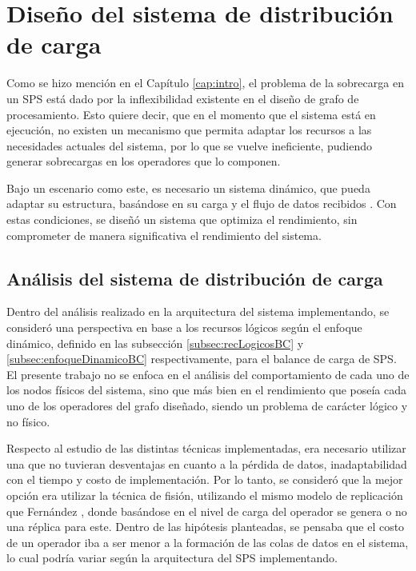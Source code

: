 \chapter{Dise\~no del sistema de distribución de carga}
\label{cap:disenoSistema}

Como se hizo mención en el Capítulo \ref{cap:intro}, el problema de la sobrecarga en un SPS está dado por la inflexibilidad existente en el diseño de grafo de procesamiento. Esto quiere decir, que en el momento que el sistema está en ejecución, no existen un mecanismo que permita adaptar los recursos a las necesidades actuales del sistema, por lo que se vuelve ineficiente, pudiendo generar sobrecargas en los operadores que lo componen.

Bajo un escenario como este, es necesario un sistema dinámico, que pueda adaptar su estructura, basándose en su carga y el flujo de datos recibidos . Con estas condiciones, se diseñó un sistema que optimiza el rendimiento, sin comprometer de manera significativa el rendimiento del sistema.

\section{Análisis del sistema de distribución de carga}
Dentro del análisis realizado en la arquitectura del sistema implementando, se consideró una perspectiva en base a los recursos lógicos según el enfoque dinámico, definido en las subsección \ref{subsec:recLogicosBC} y \ref{subsec:enfoqueDinamicoBC} respectivamente, para el balance de carga de SPS. El presente trabajo no se enfoca en el análisis del comportamiento de cada uno de los nodos físicos del sistema, sino que más bien en el rendimiento que poseía cada uno de los operadores del grafo diseñado, siendo un problema de carácter lógico y no físico.

Respecto al estudio de las distintas técnicas implementadas, era necesario utilizar una que no tuvieran desventajas en cuanto a la pérdida de datos, inadaptabilidad con el tiempo y costo de implementación. Por lo tanto, se consideró que la mejor opción era utilizar la técnica de fisión, utilizando el mismo modelo de replicación que Fernández \citep{FernandezMKP13}, donde basándose en el nivel de carga del operador se genera o no una réplica para este. Dentro de las hipótesis planteadas, se pensaba que el costo de un operador iba a ser menor a la formación de las colas de datos en el sistema, lo cual podría variar según la arquitectura del SPS implementando.


